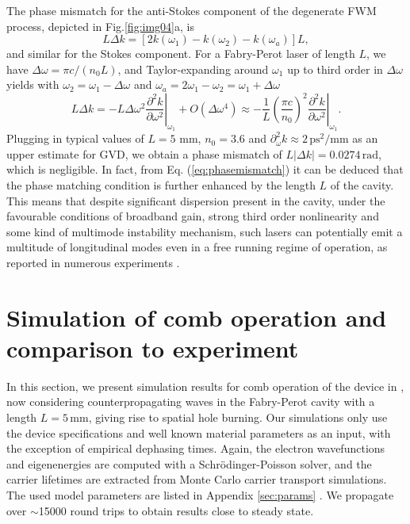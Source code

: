 \documentclass[10pt,letterpaper]{article}%
\begin{document}
The phase mismatch for the anti-Stokes component of the degenerate FWM
process, depicted in Fig.\ref{fig:img04}a, is \cite{butcher1991elements}
\begin{equation}
L\Delta k=\left[  2k(\omega_{1})-k(\omega_{2})-k(\omega_{a})\right]  L,
\end{equation}
and similar for the Stokes component. For a Fabry-Perot laser of length $L$,
we have $\Delta\omega=\pi c/\left(  n_{0}L\right)  $, and Taylor-expanding
around $\omega_{1}$ up to third order in $\Delta\omega$ yields with
$\omega_{2}=\omega_{1}-\Delta\omega$ and $\omega_{a}=2\omega_{1}-\omega
_{2}=\omega_{1}+\Delta\omega$
\begin{equation}
L\Delta k=-L\Delta\omega^{2}\left.  \frac{\partial^{2}k}{\partial\omega^{2}%
}\right|  _{\omega_{1}}+O(\Delta\omega^{4})\approx-\frac{1}{L}\left(
\frac{\pi c}{n_{0}}\right)  ^{2}\left.  \frac{\partial^{2}k}{\partial
\omega^{2}}\right|  _{\omega_{1}}.\label{eq:phasemismatch}
\end{equation}
Plugging in typical values of $L=5$ mm, $n_{0}=3.6$ and $\partial_{\omega}%
^{2}k\approx2{\,}\mathrm{ps}^{2}/\mathrm{mm}$ as an upper estimate for GVD, we
obtain a phase mismatch of $L\left|  \Delta k\right|  =0.0274{\,}\mathrm{rad}%
$, which is negligible. In fact, from Eq. (\ref{eq:phasemismatch}) it can be deduced that the 
phase matching condition is further enhanced by the length $L$ of the cavity. This means that despite significant dispersion present
in the cavity, under the favourable conditions of broadband gain, strong third
order nonlinearity and some kind of multimode instability mechanism, such
lasers can potentially emit a multitude of longitudinal modes even in a free
running regime of operation, as reported in numerous experiments
\cite{wienold2014evidence,burghoff2014terahertz,hugi2012mid,rosch2015octave}.

\section{Simulation of comb operation and comparison to experiment}

\label{sec:tdsims}

In this section, we present simulation results for comb operation of the
device in \cite{burghoff2014terahertz}, now considering counterpropagating
waves in the Fabry-Perot cavity with a length $L=5{\,}\mathrm{mm}$, giving
rise to spatial hole burning. Our simulations only use the device
specifications and well known material parameters as an input, with the
exception of empirical dephasing times. Again, the electron wavefunctions and
eigenenergies are computed with a Schr{\"{o}}dinger-Poisson solver, and the
carrier lifetimes are extracted from Monte Carlo carrier transport
simulations. The used model parameters are listed in Appendix \ref{sec:params}%
. We propagate over $\sim$15000 round trips to obtain results close to steady state.
\end{document}
